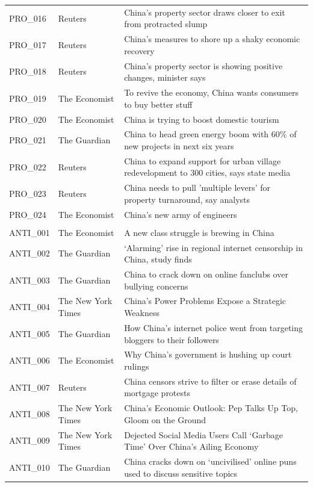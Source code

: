 \begin{longtable}{@{}p{1.5cm}p{2.6cm}p{9.8cm}@{}}
PRO\_016 & Reuters & China's property sector draws closer to exit from protracted slump \\
PRO\_017 & Reuters & China's measures to shore up a shaky economic recovery \\
PRO\_018 & Reuters & China's property sector is showing positive changes, minister says \\
PRO\_019 & The Economist & To revive the economy, China wants consumers to buy better stuff \\
PRO\_020 & The Economist & China is trying to boost domestic tourism \\
PRO\_021 & The Guardian & China to head green energy boom with 60\% of new projects in next six years \\
PRO\_022 & Reuters & China to expand support for urban village redevelopment to 300 cities, says state media \\
PRO\_023 & Reuters & China needs to pull 'multiple levers' for property turnaround, say analysts \\
PRO\_024 & The Economist & China’s new army of engineers \\
\addlinespace
\multicolumn{3}{l}{\textit{Anti-China}}\\
ANTI\_001 & The Economist & A new class struggle is brewing in China \\
ANTI\_002 & The Guardian & ‘Alarming’ rise in regional internet censorship in China, study finds \\
ANTI\_003 & The Guardian & China to crack down on online fanclubs over bullying concerns \\
ANTI\_004 & The New York Times & China’s Power Problems Expose a Strategic Weakness \\
ANTI\_005 & The Guardian & How China’s internet police went from targeting bloggers to their followers \\
ANTI\_006 & The Economist & Why China’s government is hushing up court rulings \\
ANTI\_007 & Reuters & China censors strive to filter or erase details of mortgage protests \\
ANTI\_008 & The New York Times & China’s Economic Outlook: Pep Talks Up Top, Gloom on the Ground \\
ANTI\_009 & The New York Times & Dejected Social Media Users Call ‘Garbage Time’ Over China’s Ailing Economy \\
ANTI\_010 & The Guardian & China cracks down on ‘uncivilised’ online puns used to discuss sensitive topics \\

\end{longtable}

